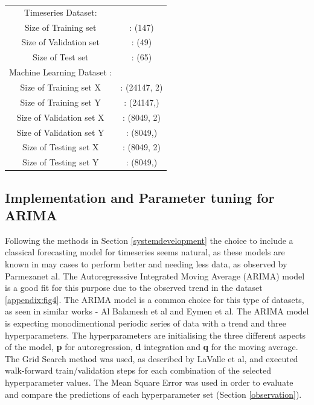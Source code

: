 \documentclass[a4paper, twocolumn]{article}
\begin{document}
\begin{flushleft}
    \begin{tabular}{ c c }
        Timeseries Dataset:\\
        Size of Training set &    : (147)\\
        Size of Validation set &  : (49)\\
        Size of Test set &        : (65)\\
        Machine Learning Dataset  :\\
        Size of Training set X &  : (24147, 2)\\
        Size of Training set Y&   : (24147,)\\
        Size of Validation set X &: (8049, 2)\\
        Size of Validation set Y& : (8049,)\\
        Size of Testing set X &   : (8049, 2)\\
        Size of Testing set Y&    : (8049,)\\

    \end{tabular}
\end{flushleft}

\subsection{Implementation and Parameter tuning for ARIMA}\label{ARIMA}
Following the methods in Section \ref{systemdevelopment} the choice to include a classical forecasting model for timeseries seems natural, as these models are known in may cases to perform better and needing less data, as observed by Parmezanet al. \cite{test} 
The Autoregresssive Integrated Moving Average (ARIMA) model is a good fit for this purpose due to the observed trend in the dataset \ref{appendix:fig4}. 
The ARIMA model is a common choice for this type of datasets, as seen in similar works - Al Balamesh et al and Eymen et al. \cite{one} \cite{two} 
The ARIMA model is expecting monodimentional periodic series of data with a trend and three hyperparameters. 
The hyperparameters are initialising the three different aspects of the model, \textbf{p} for autoregression, \textbf{d} integration and \textbf{q} for the moving average. 
The Grid Search method was used, as described by LaValle et al, \cite{lavalle2004relationship} and executed walk-forward train/validation steps for each combination of the selected hyperparameter values. 
The Mean Square Error was used in order to evaluate and compare the predictions of each hyperparameter set (Section \ref{observation}).
\end{document}
